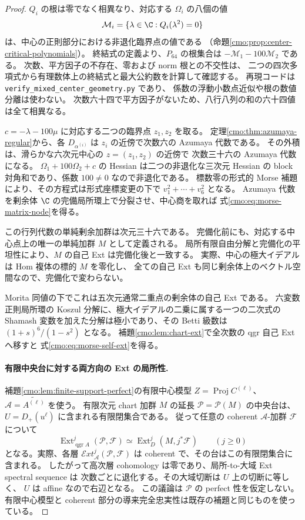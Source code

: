 \begin{proof}
$Q_i$ の根は零でなく相異なり、対応する $\Omega_i$ の八個の値
\[
 \mathcal M_i=\{\lambda\in\C:Q_i(\lambda^2)=0\}
\]
は、中心の正則部分における非退化臨界点の値である
（命題\ref{cmo:prop:center-critical-polynomials}）。
終結式の定義より、$P_{64}$ の根集合は
$-\mathcal M_1-100\mathcal M_2$ である。
次数、平方因子の不存在、零および norm 根との不交性は、
二つの四次多項式から有理数体上の終結式と最大公約数を計算して確認する。
再現コードは \texttt{verify\_mixed\_center\_geometry.py} であり、
係数の浮動小数点近似や根の数値分離は使わない。
次数六十四で平方因子がないため、八行八列の和の六十四値は全て相異なる。

$c=-\lambda-100\mu$ に対応する二つの臨界点 $z_1,z_2$ を取る。
定理\ref{cmo:thm:azumaya-regular}から、各 $D_{\alpha^{(i)}}$ は
$z_i$ の近傍で次数六の Azumaya 代数である。
その外積は、滑らかな六次元中心の $z=(z_1,z_2)$ の近傍で
次数三十六の Azumaya 代数になる。
$\Omega_1+100\Omega_2+c$ の Hessian は二つの非退化な三次元 Hessian の
block 対角和であり、係数 $100\ne0$ なので非退化である。
標数零の形式的 Morse 補題により、その方程式は形式座標変更の下で
$v_1^2+\cdots+v_6^2$ となる。
Azumaya 代数を剰余体 $\C$ の完備局所環上で分裂させ、中心商を取れば
式\eqref{cmo:eq:morse-matrix-node}を得る。

この行列代数の単純剰余加群は次元三十六である。
完備化前にも、対応する中心点上の唯一の単純加群 $M$ として定義される。
局所有限自由分解と完備化の平坦性により、$M$ の自己 Ext は完備化後と一致する。
実際、中心の極大イデアルは Hom 複体の標的 $M$ を零化し、
全ての自己 Ext も同じ剰余体上のベクトル空間なので、完備化で変わらない。

Morita 同値の下でこれは五次元通常二重点の剰余体の自己 Ext である。
六変数正則局所環の Koszul 分解に、極大イデアルの二乗に属する一つの二次式の
Shamash 変数を加えた分解は極小であり、その Betti 級数は
$(1+s)^6/(1-s^2)$ となる。
補題\ref{cmo:lem:chart-ext}で全次数の qgr 自己 Ext へ移すと
式\eqref{cmo:eq:morse-self-ext}を得る。

\paragraph{有限中央台に対する両方向の Ext の局所性.}
補題\ref{cmo:lem:finite-support-perfect}の有限中心模型
$Z=\operatorname{Proj}C^{(\ell)}$、$\mathcal A=\widetilde{A^{(\ell)}}$ を使う。
有限次元 chart 加群 $M$ の延長 $\mathcal P=\mathcal P(M)$ の中央台は、
$U=D_+(u^\ell)$ に含まれる有限閉集合である。
従って任意の coherent $\mathcal A$-加群 $\mathcal F$ について
\begin{equation}\label{cmo:eq:finite-support-local-ext}
 \operatorname{Ext}^j_{\operatorname{qgr}A}(\mathcal P,\mathcal F)
 \simeq\operatorname{Ext}^j_D(M,j^*\mathcal F)
 \qquad(j\ge0)
\end{equation}
となる。実際、各層 $\mathcal E xt^j_{\mathcal A}(\mathcal P,\mathcal F)$ は
coherent で、その台はこの有限閉集合に含まれる。
したがって高次層 cohomology は零であり、局所-to-大域 Ext spectral sequence は
次数ごとに退化する。その大域切断は $U$ 上の切断に等しく、
$U$ は affine なので右辺となる。
この議論は $\mathcal P$ の perfect 性を仮定しない。
有限中心模型と coherent 部分の導来完全忠実性は既存の補題と同じものを使っている。


\end{proof}
